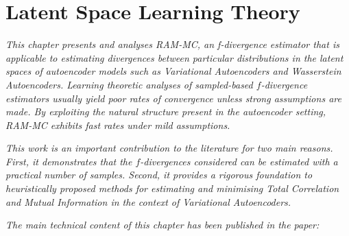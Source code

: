 \chapter{Latent Space Learning Theory}\label{chapter:latent-space-learning-theory}

\ifpdf
    \graphicspath{{Chapter5/Figs/Raster/}{Chapter5/Figs/PDF/}{Chapter5/Figs/}}
\else
    \graphicspath{{Chapter5/Figs/Vector/}{Chapter5/Figs/}}
\fi

\emph{This chapter presents and analyses RAM-MC, an f-divergence estimator that is applicable to estimating divergences between particular distributions in the latent spaces of autoencoder models such as Variational Autoencoders and Wasserstein Autoencoders. 
Learning theoretic analyses of sampled-based $f$-divergence estimators usually yield poor rates of convergence unless strong assumptions are made.
By exploiting the natural structure present in the autoencoder setting, RAM-MC exhibits fast rates under mild assumptions.}

\emph{This work is an important contribution to the literature for two main reasons. 
First, it demonstrates that the $f$-divergences considered can be estimated with a practical number of samples.
Second, it provides a rigorous foundation to heuristically proposed methods for estimating and minimising Total Correlation and Mutual Information in the context of Variational Autoencoders.}

\emph{The main technical content of this chapter has been published in the paper:}

\begin{quote}
\end{quote}

%
%
%
%

